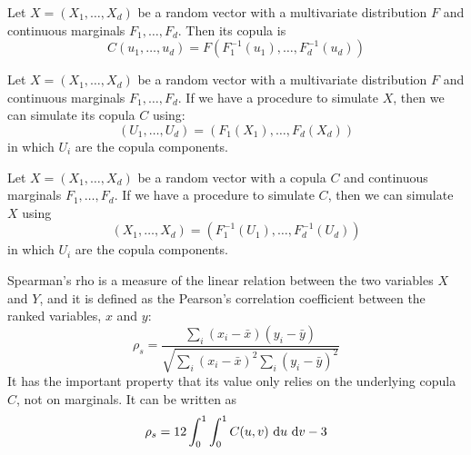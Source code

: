 \documentclass[11pt,fleqn]{book} %
\begin{document}
\begin{corollary}
	\label{cor:cop1}
	Let $X=(X_1, \dots, X_d)$ be a random vector with a multivariate 
	distribution $F$ and continuous marginals $F_1, \dots, F_d$. 
	Then its copula is
	\begin{displaymath}
		C(u_1,\dots,u_d) = F(F_1^{-1}(u_1), \dots, F_d^{-1}(u_d))
	\end{displaymath}
\end{corollary}

\begin{corollary}
	\label{cor:cop2}
	Let $X=(X_1, \dots, X_d)$ be a random vector with a multivariate 
	distribution $F$ and continuous marginals $F_1, \dots, F_d$.
	If we have a procedure to simulate $X$, then we can simulate 
	its copula $C$ using:
	\begin{displaymath}
		(U_1, \dots, U_d) = (F_1(X_1), \dots, F_d(X_d))
	\end{displaymath}
	in which $U_i$ are the copula components.
\end{corollary}

\begin{corollary}
	\label{cor:cop3}
	Let $X=(X_1, \dots, X_d)$ be a random vector with a copula $C$
	and continuous marginals $F_1, \dots, F_d$. If we have a
	procedure to simulate $C$, then we can simulate $X$ using
	\begin{displaymath}
		(X_1, \dots, X_d) = (F_1^{-1}(U_1), \dots, F_d^{-1}(U_d))
	\end{displaymath}
	in which $U_i$ are the copula components.
\end{corollary}

\begin{definition}
	Spearman's rho is a measure of the linear relation between the two 
	variables $X$ and $Y$, and it is defined as the Pearson's correlation 
	coefficient between the ranked variables, $x$ and $y$:
	\begin{displaymath}
		\rho_s = \frac{\displaystyle \sum_i (x_i-\bar{x}) (y_i-\bar{y})}
		{\sqrt{\displaystyle \sum_i (x_i-\bar{x})^2 \sum_i (y_i-\bar{y})^2}}
	\end{displaymath}
	It has the important property that its value only relies on the underlying 
	copula $C$, not on marginals. It can be written as
	\begin{displaymath}
		\rho_s = 12 \displaystyle \int_0^1 \int_0^1 C(u,v) \mathop{\,\mathrm{{}d}}\mathopen{} u \mathop{\,\mathrm{{}d}}\mathopen{} v -3
	\end{displaymath}
\end{definition}
\end{document}
